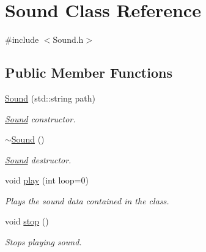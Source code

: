 \hypertarget{class_sound}{}\section{Sound Class Reference}
\label{class_sound}


{\ttfamily \#include $<$Sound.\+h$>$}

\subsection*{Public Member Functions}
\begin{DoxyCompactItemize}
\item 
\hyperlink{class_sound_a77d59da64652f107b972f7dd5e468c5d}{Sound} (std\+::string path)
\begin{DoxyCompactList}\small\item\em \hyperlink{class_sound}{Sound} constructor. \end{DoxyCompactList}\item 
\hyperlink{class_sound_a0907389078bf740be2a5763366ad3376}{$\sim$\+Sound} ()\hypertarget{class_sound_a0907389078bf740be2a5763366ad3376}{}\label{class_sound_a0907389078bf740be2a5763366ad3376}

\begin{DoxyCompactList}\small\item\em \hyperlink{class_sound}{Sound} destructor. \end{DoxyCompactList}\item 
void \hyperlink{class_sound_a8705e3cb2a6407365cd6155bab713a1c}{play} (int loop=0)\hypertarget{class_sound_a8705e3cb2a6407365cd6155bab713a1c}{}\label{class_sound_a8705e3cb2a6407365cd6155bab713a1c}

\begin{DoxyCompactList}\small\item\em Plays the sound data contained in the class. \end{DoxyCompactList}\item 
void \hyperlink{class_sound_a07c551ab56d2f83a861a2f7fd81b480a}{stop} ()\hypertarget{class_sound_a07c551ab56d2f83a861a2f7fd81b480a}{}\label{class_sound_a07c551ab56d2f83a861a2f7fd81b480a}

\begin{DoxyCompactList}\small\item\em Stops playing sound. \end{DoxyCompactList}\end{DoxyCompactItemize}

